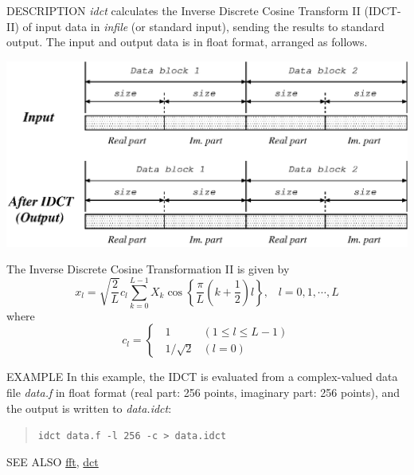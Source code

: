 \begin{synopsis}
 \item[idct] [ --l $L$ ] [ --c ] [ --d ] [ {\em infile} ]
\end{synopsis}

\begin{qsection}{DESCRIPTION}
{\em idct} calculates the Inverse Discrete Cosine Transform II (IDCT-II)
of input data in {\em infile} (or standard input),
sending the results to standard output.
The input and output data is in float format, arranged as follows.
\begin{center}
 \leavevmode
 \includegraphics{fig/idct.eps}
\end{center}
The Inverse Discrete Cosine Transformation II is given by
\begin{displaymath}
 x_{l} = \sqrt{\frac{2}{L}}c_{l}\sum_{k=0}^{L-1}
 X_{k}
 \cos\left\{\frac{\pi}{L} \left( k + \frac{1}{2} \right) l\right\},
\;\;\; l = 0, 1, \cdots, L
\end{displaymath}
where
 \begin{displaymath}
c_{l}= \begin{cases}
         \;\;1 & ( 1 \le l \le L - 1 ) \\
         \;\; 1 / \sqrt{2} & (l = 0)
        \end{cases}
 \end{displaymath}
\par
\end{qsection}

\begin{options}
\end{options}

\begin{qsection}{EXAMPLE}
In this example, the IDCT is evaluated from a complex-valued data file
{\em data.f} in float format
(real part: 256 points, imaginary part: 256 points),
and the output is written to {\em data.idct}:
\begin{quote}
  \verb!idct data.f -l 256 -c > data.idct!
\end{quote}
\end{qsection}

\begin{qsection}{SEE ALSO}
 \hyperlink{fft}{fft},
 \hyperlink{dct}{dct}
\end{qsection}
